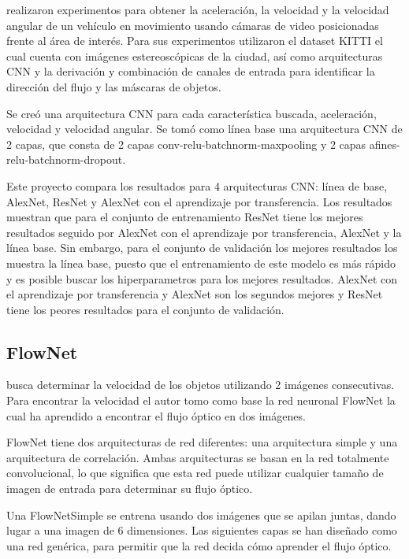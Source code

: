 \cite{zhang2017Vehicle} realizaron experimentos para obtener la aceleración, la velocidad y la velocidad angular de un vehículo en movimiento usando cámaras de video posicionadas frente al área de interés. Para sus experimentos utilizaron el dataset KITTI el cual cuenta con imágenes estereoscópicas de la ciudad, así como arquitecturas CNN y la derivación y combinación de canales de entrada para identificar la dirección del flujo y las máscaras de objetos.

Se creó una arquitectura CNN para cada característica buscada, aceleración, velocidad y velocidad angular. Se tomó como línea base una arquitectura CNN de 2 capas, que consta de 2 capas conv-relu-batchnorm-maxpooling y 2 capas afines-relu-batchnorm-dropout.

Este proyecto compara los resultados para 4 arquitecturas CNN: línea de base, AlexNet, ResNet y AlexNet con el aprendizaje por transferencia.  Los resultados muestran que para el conjunto de entrenamiento ResNet tiene los mejores resultados seguido por AlexNet con el aprendizaje por transferencia, AlexNet y la línea base. Sin embargo, para el conjunto de validación  los mejores resultados los muestra la línea base, puesto que el entrenamiento de este modelo es más rápido y es posible buscar los hiperparametros para los mejores resultados. AlexNet con el aprendizaje por transferencia y AlexNet son los segundos mejores y ResNet tiene los peores resultados para el conjunto de validación.

\subsection{FlowNet}

\cite{loor2017Visual} busca determinar la velocidad de los objetos utilizando 2 imágenes consecutivas. Para encontrar la velocidad el autor tomo como base la red neuronal FlowNet la cual ha aprendido a encontrar el flujo óptico en dos imágenes.

FlowNet tiene dos arquitecturas de red diferentes: una arquitectura simple y una arquitectura de correlación. Ambas arquitecturas se basan en la red totalmente convolucional, lo que significa que esta red puede utilizar cualquier tamaño de imagen de entrada para determinar su flujo óptico.

Una FlowNetSimple se entrena usando dos imágenes que se apilan juntas, dando lugar a una imagen de 6 dimensiones. Las siguientes capas se han diseñado como una red genérica, para permitir que la red decida cómo aprender el flujo óptico.

